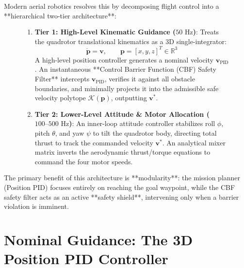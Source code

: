 \documentclass[11pt,a4paper]{article}
\begin{document}
Modern aerial robotics resolves this by decomposing flight control into a **hierarchical two-tier architecture**:

\begin{figure}[H]
\centering
\begin{minipage}{0.95\textwidth}
\begin{tcolorbox}[colback=blue!2!white, colframe=blue!60!black, arc=2mm, title=\textbf{Two-Tier Hierarchical Control Architecture}]
\begin{enumerate}
    \item \textbf{Tier 1: High-Level Kinematic Guidance ($50\text{ Hz}$)}:
    Treats the quadrotor translational kinematics as a 3D single-integrator:
    \begin{equation}
    \mathbf{\dot{p}} = \mathbf{v}, \qquad \mathbf{p} = [x, y, z]^T \in \mathbb{R}^3
    \label{eq:single_integrator}
    \end{equation}
    A high-level position controller generates a nominal velocity $\mathbf{v}_{\mathrm{PID}}$. An instantaneous **Control Barrier Function (CBF) Safety Filter** intercepts $\mathbf{v}_{\mathrm{PID}}$, verifies it against all obstacle boundaries, and minimally projects it into the admissible safe velocity polytope $\mathcal{K}(\mathbf{p})$, outputting $\mathbf{v}^*$.
    
    \item \textbf{Tier 2: Lower-Level Attitude \& Motor Allocation ($100\text{--}500\text{ Hz}$)}:
    An inner-loop attitude controller stabilizes roll $\phi$, pitch $\theta$, and yaw $\psi$ to tilt the quadrotor body, directing total thrust to track the commanded velocity $\mathbf{v}^*$. An analytical mixer matrix inverts the aerodynamic thrust/torque equations to command the four motor speeds.
\end{enumerate}
\end{tcolorbox}
\end{minipage}
\end{figure}

The primary benefit of this architecture is **modularity**: the mission planner (Position PID) focuses entirely on reaching the goal waypoint, while the CBF safety filter acts as an active **safety shield**, intervening only when a barrier violation is imminent.

\section{Nominal Guidance: The 3D Position PID Controller}
\end{document}
